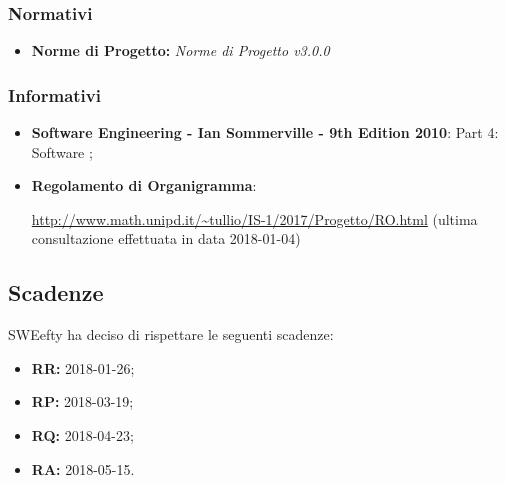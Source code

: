 			\subsubsection{Normativi}
			\begin{itemize}
				\item \textbf{Norme di Progetto:} \emph{Norme di Progetto v3.0.0}
			\end{itemize}
			\subsubsection{Informativi}
			\begin{itemize}
				\item \textbf{Software Engineering - Ian Sommerville - 9th Edition 2010}:  Part 4: Software ;
				\item \textbf{Regolamento di Organigramma}: \par
				\url{http://www.math.unipd.it/~tullio/IS-1/2017/Progetto/RO.html} (ultima consultazione effettuata in data 2018-01-04)
			\end{itemize}
			
	\subsection{Scadenze}
	\label{scadenze}
	SWEefty ha deciso di rispettare le seguenti scadenze:
	\begin{itemize}
		\item \textbf{RR:} 2018-01-26;
		\item \textbf{RP:} 2018-03-19;
		\item \textbf{RQ:} 2018-04-23;
		\item \textbf{RA:} 2018-05-15.
	\end{itemize}
